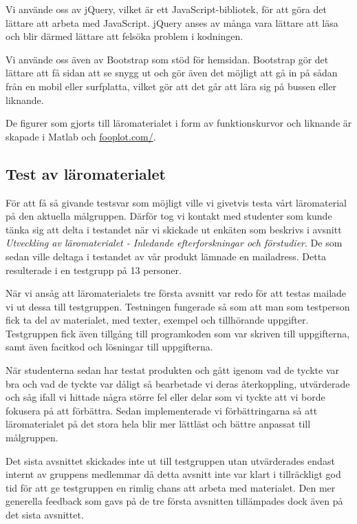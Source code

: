 \documentclass[]{article}
\begin{document}
Vi använde oss av jQuery, vilket är ett JavaScript-bibliotek, för att göra det lättare att arbeta med JavaScript. jQuery
anses av många vara lättare att läsa och blir därmed lättare att felsöka problem i kodningen.

Vi använde oss även av Bootstrap som stöd för hemsidan. Bootstrap gör det lättare att få sidan att se snygg ut och gör
även det möjligt att gå in på sådan från en mobil eller surfplatta, vilket gör att det går att lära sig på bussen eller
liknande.

De figurer som gjorts till läromaterialet i form av funktionskurvor och liknande är skapade i
Matlab och \url{fooplot.com/}.


\subsection{Test av läromaterialet}

För att få så givande testsvar som möjligt ville vi givetvis testa vårt läromaterial på den aktuella målgruppen. Därför
tog vi kontakt med studenter som kunde tänka sig att delta i testandet när vi skickade ut enkäten som beskrivs i avsnitt
\textit{Utveckling av läromaterialet - Inledande efterforskningar och förstudier}. De som sedan ville deltaga i
testandet av vår produkt lämnade en mailadress. Detta resulterade i en testgrupp på 13 personer.

När vi ansåg att läromaterialets tre första avsnitt var redo för att testas mailade vi ut dessa till testgruppen.
Testningen fungerade så som att man som testperson fick ta del av materialet, med texter, exempel och tillhörande
uppgifter. Testgruppen fick även tillgång till programkoden som var skriven till uppgifterna, samt även facitkod och
lösningar till uppgifterna.

När studenterna sedan har testat produkten och gått igenom vad de tyckte var bra och vad de tyckte var dåligt så
bearbetade vi deras återkoppling, utvärderade och såg ifall vi hittade några större fel eller delar som vi tyckte att vi
borde fokusera på att förbättra. Sedan implementerade vi förbättringarna så att läromaterialet på det stora hela blir
mer lättläst och bättre anpassat till målgruppen.

Det sista avsnittet skickades inte ut till testgruppen utan utvärderades endast internt av gruppens medlemmar då detta
avsnitt inte var klart i tillräckligt god tid för att ge testgruppen en rimlig chans att arbeta med materialet. Den mer
generella feedback som gavs på de tre första avsnitten tillämpades dock även på det sista avsnittet.
\end{document}
